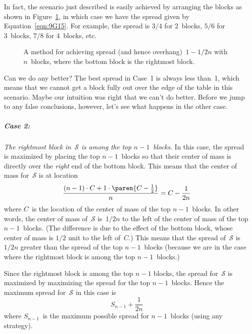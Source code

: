 In fact, the scenario just described is easily achieved by arranging
the blocks as shown in Figure~\ref{fig:9G15}, in which case we have
the spread given by Equation~\ref{eqn:9G15}.  For example, the spread
is $3/4$ for 2~blocks, $5/6$ for 3~blocks, $7/8$ for 4~blocks, etc.

\begin{figure}


\caption{A method for achieving spread (and hence overhang)~$1 - 1/2n$
  with $n$~blocks, where the bottom block is the rightmost block.}

\label{fig:9G15}

\end{figure}

Can we do any better?  The best spread in Case~1 is always less
than~1, which means that we cannot get a block fully out over the edge
of the table in this scenario.  Maybe our intuition was right that we
can't do better.  Before we jump to any false conclusions, however,
let's see what happens in the other case.

\subparagraph{Case 2:}

\emph{The rightmost block in~$\mathcal{S}$ is among the top $n -
  1$~blocks.}  In this case, the spread is maximized by placing the
top $n - 1$~blocks so that their center of mass is directly over the
\emph{right} end of the bottom block.  This means that the center of
mass for~$\mathcal{S}$ is at location
\begin{equation*}
    \frac{(n - 1) \cdot C + 1 \cdot \paren{C - \frac{1}{2}}}{n}
    = C - \frac{1}{2n}
\end{equation*}
where $C$~is the location of the center of mass of the top $n -
1$~blocks.  In other words, the center of mass of~$\mathcal{S}$
is~$1/2n$ to the left of the center of mass of the top $n - 1$~blocks.
(The difference is due to the effect of the bottom block, whose center
of mass is $1/2$ unit to the left of~$C$.)  This means that the spread
of~$\mathcal{S}$ is $1/2n$ greater than the spread of the top $n -
1$~blocks (because we are in the case where the rightmost block is
among the top $n - 1$~blocks.)

Since the rightmost block is among the top $n - 1$ blocks, the spread
for~$\mathcal{S}$ is maximized by maximizing the spread for the top $n
- 1$~blocks.  Hence the maximum spread for~$\mathcal{S}$ in this case
is
\begin{equation}\label{eqn:9G16}
    S_{n - 1} + \frac{1}{2n}
\end{equation}
where $S_{n - 1}$~is the maximum possible spread for $n - 1$~blocks
(using any strategy).

